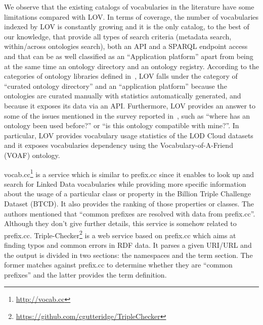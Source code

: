 We observe that the existing catalogs of vocabularies in the literature have some limitations compared with LOV. In terms of coverage, the number of vocabularies indexed by LOV is constantly growing and it is the only catalog, to the best of our knowledge, that provide all types of search criteria (metadata search, within/across ontologies search), both an API and a SPARQL endpoint access and that can be as well classified as an ``Application platform'' apart from being at the same time an ontology directory and an ontology registry. According to the categories of ontology libraries defined in~\cite{AquinJoWS12}, LOV falls under the category of ``curated ontology directory'' and an ``application platform'' because the ontologies are curated manually with statistics automatically generated, and because it exposes its data via an API. Furthermore, LOV provides an answer to some of the issues mentioned in the survey reported in~\cite{AquinJoWS12}, such as ``where has an ontology been used before?'' or ``is this ontology compatible with mine?''. In particular, LOV provides vocabulary usage statistics of the LOD Cloud datasets and it exposes vocabularies dependency using the Vocabulary-of-A-Friend (VOAF) ontology.

vocab.cc\footnote{\url{http://vocab.cc}} is a service which is similar to prefix.cc since it enables to look up and search for Linked Data vocabularies while providing more specific information about the usage of a particular class or property in the Billion Triple Challenge Dataset (BTCD). It also provides the ranking of those properties or classes. The authors mentioned that ``common prefixes are resolved with data from prefix.cc''. Although they don't give further details, this service is somehow related to prefix.cc. Triple-Checker\footnote{\url{https://github.com/cgutteridge/TripleChecker}} is a web service based on prefix.cc which aims at finding typos and common errors in RDF data. It parses a given URI/URL and the output is divided in two sections: the namespaces and the term section. The former matches against prefix.cc to determine whether they are ``common prefixes'' and the latter provides the term definition.


